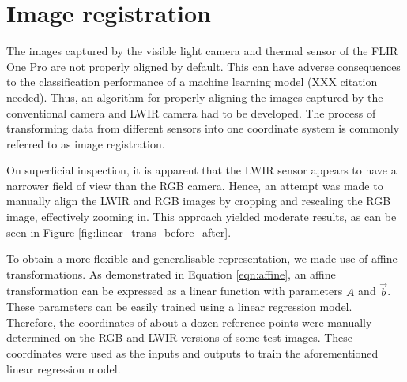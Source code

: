 \documentclass{l4proj}
\begin{document}

\section{Image registration}
\label{image_registration}

The images captured by the visible light camera and thermal sensor of the FLIR One Pro are not properly aligned by default. This can have adverse consequences to the classification performance of a machine learning model (XXX citation needed). Thus, an algorithm for properly aligning the images captured by the conventional camera and LWIR camera had to be developed. The process of transforming data from different sensors into one coordinate system is commonly referred to as image registration.

On superficial inspection, it is apparent that the LWIR sensor appears to have a narrower field of view than the RGB camera. Hence, an attempt was made to manually align the LWIR and RGB images by cropping and rescaling the RGB image, effectively zooming in. This approach yielded moderate results, as can be seen in Figure \ref{fig:linear_trans_before_after}.

To obtain a more flexible and generalisable representation, we made use of affine transformations. As demonstrated in Equation \ref{eqn:affine}, an affine transformation can be expressed as a linear function with parameters $A$ and $\vec{b}$. These parameters can be easily trained using a linear regression model. Therefore, the coordinates of about a dozen reference points were manually determined on the RGB and LWIR versions of some test images. These coordinates were used as the inputs and outputs to train the aforementioned linear regression model. 


\end{document}
